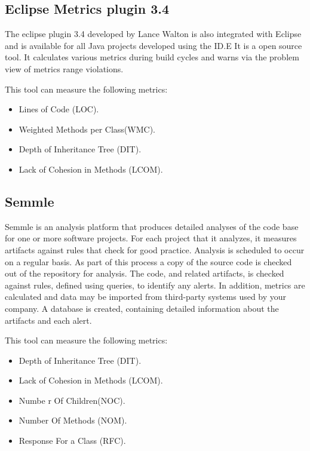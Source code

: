 \subsection{Eclipse Metrics plugin 3.4}
The  eclipse  plugin  3.4 developed  by  Lance  Walton  is  also  integrated  with Eclipse   and   is   available   for   all   Java   projects 
developed using the ID.E It is a open source tool. It calculates various metrics during build cycles and warns via the problem view of metrics range violations.

This tool can measure the following metrics:
\begin{itemize}
	\item Lines of Code (LOC). 
	\item Weighted Methods per Class(WMC).
	\item Depth of Inheritance Tree (DIT).
    \item Lack of Cohesion in Methods (LCOM).
\end{itemize}

\subsection{Semmle}

Semmle is an analysis platform that produces detailed analyses of the code base for one or more software projects. For each project that it analyzes, it measures artifacts against rules that check for good practice. Analysis is scheduled to occur on a regular basis. As part of this process a copy of the source code is checked out of the repository for analysis. The code, and related artifacts, is checked against rules, defined using queries, to identify any alerts. In addition, metrics are calculated and data may be imported from third-party systems used by your company. A database is created, containing detailed information about the artifacts and each alert.

This tool can measure the following metrics:
\begin{itemize}
	\item Depth of Inheritance Tree (DIT).
	\item Lack of Cohesion in Methods (LCOM).
	\item Numbe r Of Children(NOC).
	\item Number Of Methods (NOM).
	\item Response For a Class (RFC).
\end{itemize}


